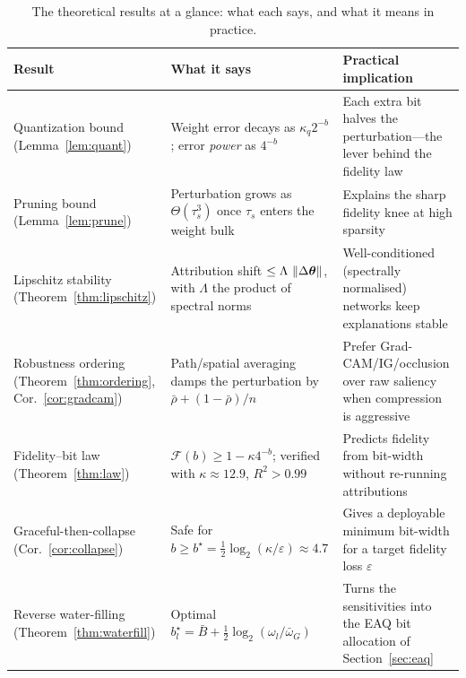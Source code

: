 \begin{table}[!t]
\caption{The theoretical results at a glance: what each says, and what it means
in practice.}
\label{tab:theorysummary}
\centering
\footnotesize
\renewcommand{\arraystretch}{1.25}
\begin{tabular}{p{2.9cm} p{5.6cm} p{6.4cm}}
\hline
\textbf{Result} & \textbf{What it says} & \textbf{Practical implication}\\
\hline
Quantization bound (Lemma~\ref{lem:quant}) &
Weight error decays as $\kappa_q 2^{-b}$; error \emph{power} as $4^{-b}$ &
Each extra bit halves the perturbation---the lever behind the fidelity law\\
Pruning bound (Lemma~\ref{lem:prune}) &
Perturbation grows as $\Theta(\tau_s^3)$ once $\tau_s$ enters the weight bulk &
Explains the sharp fidelity knee at high sparsity\\
Lipschitz stability (Theorem~\ref{thm:lipschitz}) &
Attribution shift $\le\Lambda\,\left\lVert\Delta\bm{\theta}\right\rVert$, with $\Lambda$ the product
of spectral norms &
Well-conditioned (spectrally normalised) networks keep explanations stable\\
Robustness ordering (Theorem~\ref{thm:ordering}, Cor.~\ref{cor:gradcam}) &
Path/spatial averaging damps the perturbation by $\bar\rho+(1-\bar\rho)/n$ &
Prefer Grad-CAM/IG/occlusion over raw saliency when compression is aggressive\\
Fidelity--bit law (Theorem~\ref{thm:law}) &
$\mathcal F(b)\ge 1-\kappa 4^{-b}$; verified with $\kappa\approx12.9$, $R^2>0.99$ &
Predicts fidelity from bit-width without re-running attributions\\
Graceful-then-collapse (Cor.~\ref{cor:collapse}) &
Safe for $b\ge b^\star=\tfrac12\log_2(\kappa/\varepsilon)\approx4.7$ &
Gives a deployable minimum bit-width for a target fidelity loss $\varepsilon$\\
Reverse water-filling (Theorem~\ref{thm:waterfill}) &
Optimal $b_l^\star=\bar B+\tfrac12\log_2(\omega_l/\bar\omega_G)$ &
Turns the sensitivities into the EAQ bit allocation of Section~\ref{sec:eaq}\\
\hline
\end{tabular}
\end{table}
